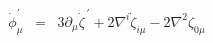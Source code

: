 \begin{equation}
\dot \phi^{\prime}_{\mu} \;\; =\;\; 3 \partial_{\mu} \dot \zeta^{\,\prime} + 2 \nabla ^{i} \dot 
\zeta_{i\mu} -2 \nabla^2 \zeta_{0\mu} 
\label{eq:b11}
\end{equation}

